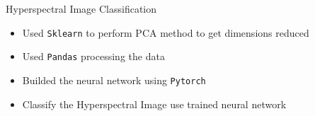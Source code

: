 \documentclass{resume}
\begin{document}
\begin{onehalfspacing}
Hyperspectral Image Classification
\begin{itemize}
  \item Used \texttt{Sklearn} to perform PCA method to get dimensions reduced
  \item Used \texttt{Pandas} processing the data
  \item Builded the neural network using \texttt{Pytorch}
  \item Classify the Hyperspectral Image use trained neural network
\end{itemize}
\end{onehalfspacing}





%
%
\end{document}
